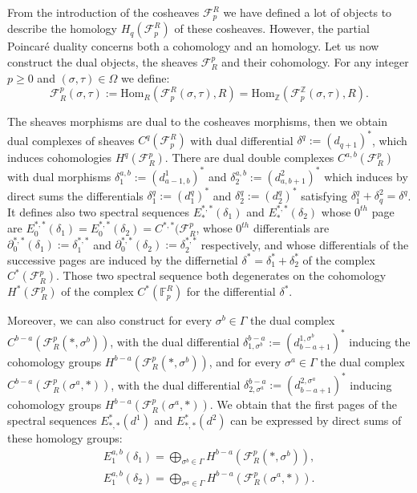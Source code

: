 \documentclass{article}
\begin{document}
From the introduction of the cosheaves $\mathcal{F}_p^R$ we have defined a lot of objects to describe the homology $H_q(\mathcal{F}_p^R)$ of these cosheaves. However, the partial Poincaré duality concerns both a cohomology and an homology. Let us now construct the dual objects, the sheaves $\mathcal{F}^p_R$ and their cohomology. For any integer $p \geq 0$ and $(\sigma,\tau) \in \Omega$ we define:
\begin{equation*}
    \mathcal{F}^p_R(\sigma,\tau):= \mathrm{Hom}_{R}(\mathcal{F}^R_p(\sigma,\tau),R) = \mathrm{Hom}_{\mathbb{Z}}(\mathcal{F}^{\mathbb{Z}}_p(\sigma,\tau),R).
\end{equation*}

The sheaves morphisms are dual to the cosheaves morphisms, then we obtain dual complexes of sheaves $C^q(\mathcal{F}_p^R)$ with dual differential $\delta^q:=(d_{q+1})^*$, which induces cohomologies $H^q(\mathcal{F}^p_R)$. There are dual double complexes $C^{a,b}(\mathcal{F}^p_R)$ with dual morphisms $\delta_1^{a,b}:=(d^1_{a-1,b})^*$ and $\delta_2^{a,b}:=(d^2_{a,b+1})^*$ which induces by direct sums the differentials $\delta^q_1:=(d^q_1)^*$ and $\delta^q_2:=(d^q_2)^*$ satisfying $\delta^q_1+\delta_q^2=\delta^q$. It defines also two spectral sequences $E^{*,*}_*(\delta_1)$ and $E^{*,*}_*(\delta_2)$ whose $0^{th}$ page are $E^{*,*}_0(\delta_1)=E^{*,*}_0(\delta_2)=C^{*,*}(\mathcal{F}^p_R$, whose $0^{th}$ differentials are $\partial_0^{*,*}(\delta_1):=\delta_1^{*,*}$ and $\partial_0^{*,*}(\delta_2):=\delta_2^{*,*}$ respectively, and whose differentials of the successive pages are induced by the differnetial $\delta^* = \delta_1^* + \delta_2^*$ of the complex $C^*(\mathcal{F}^p_R)$. Those two spectral sequence both degenerates on the cohomology $H^*(\mathcal{F}^p_R)$ of the complex $C^*(\mathbb{F}^R_p)$ for the differential $\delta^*$.

Moreover, we can also construct for every $\sigma^b \in \Gamma$ the dual complex $C^{b-a}(\mathcal{F}^p_R(*,\sigma^b))$, with the dual differential $\delta^{b-a}_{1,\sigma^b}:= (d_{b-a+1}^{1,\sigma^b})^*$ inducing the cohomology groups $H^{b-a}(\mathcal{F}^p_R(*,\sigma^b))$, and for every $\sigma^a \in \Gamma$ the dual complex $C^{b-a}(\mathcal{F}^p_R(\sigma^a,*))$, with the dual differential $\delta^{b-a}_{2,\sigma^a}:= (d_{b-a+1}^{2,\sigma^a})^*$ inducing cohomology groups $H^{b-a}(\mathcal{F}^p_R(\sigma^a,*))$. We obtain that the first pages of the spectral sequences $E^*_{*,*}(d^1)$ and $E^*_{*,*}(d^2)$ can be expressed by direct sums of these homology groups:
\begin{align*}
    E_1^{a,b}(\delta_1)=\bigoplus_{\sigma^b \in \Gamma} H^{b-a}(\mathcal{F}^p_R(*,\sigma^b)), \\
    E_1^{a,b}(\delta_2)=\bigoplus_{\sigma^a \in \Gamma} H^{b-a}(\mathcal{F}^p_R(\sigma^a,*)).
\end{align*}
\end{document}
